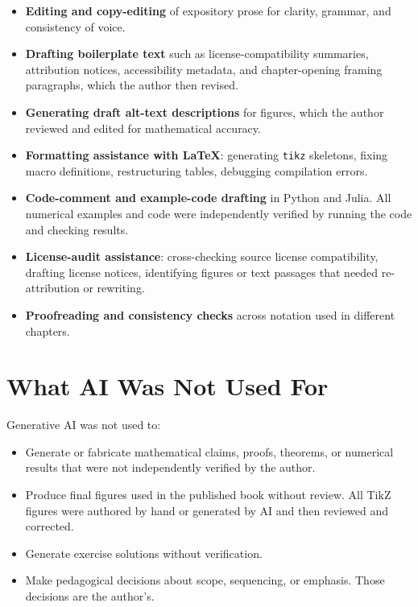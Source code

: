 \begin{itemize}
  \item \textbf{Editing and copy-editing} of expository prose for
    clarity, grammar, and consistency of voice.
  \item \textbf{Drafting boilerplate text} such as license-compatibility
    summaries, attribution notices, accessibility metadata, and
    chapter-opening framing paragraphs, which the author then revised.
  \item \textbf{Generating draft alt-text descriptions} for figures,
    which the author reviewed and edited for mathematical accuracy.
  \item \textbf{Formatting assistance with \LaTeX{}}: generating
    \texttt{tikz} skeletons, fixing macro definitions, restructuring
    tables, debugging compilation errors.
  \item \textbf{Code-comment and example-code drafting} in Python and
    Julia. All numerical examples and code were independently verified
    by running the code and checking results.
  \item \textbf{License-audit assistance}: cross-checking source
    license compatibility, drafting license notices, identifying
    figures or text passages that needed re-attribution or rewriting.
  \item \textbf{Proofreading and consistency checks} across notation
    used in different chapters.
\end{itemize}

\section*{What AI Was Not Used For}

Generative AI was not used to:

\begin{itemize}
  \item Generate or fabricate mathematical claims, proofs, theorems,
    or numerical results that were not independently verified by the
    author.
  \item Produce final figures used in the published book without
    review. All TikZ figures were authored by hand or generated by AI
    and then reviewed and corrected.
  \item Generate exercise solutions without verification.
  \item Make pedagogical decisions about scope, sequencing, or
    emphasis. Those decisions are the author's.
\end{itemize}

